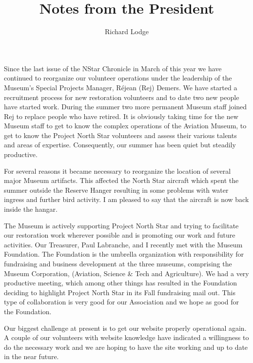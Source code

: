 
%


\title{Notes from the President}
\author{Richard Lodge}

\maketitle

Since the last issue of the NStar Chronicle in March of this year we
have continued to reorganize our volunteer operations under the
leadership of the Museum's Special Projects Manager, R\'{e}jean (Rej)
Demers. We have started a recruitment process for new restoration
volunteers and to date two new people have started work. During the
summer two more permanent Museum staff joined Rej to replace people who
have retired. It is obviously taking time for the new Museum staff to
get to know the complex operations of the Aviation Museum, to get to
know the Project North Star volunteers and assess their various talents
and areas of expertise. Consequently, our summer has been quiet but
steadily productive.

For several reasons it became necessary to reorganize the location of
several major Museum artifacts. This affected the North Star aircraft
which spent the summer outside the Reserve Hanger resulting in some
problems with water ingress and further bird activity. I am pleased to
say that the aircraft is now back inside the hangar.

The Museum is actively supporting Project North Star and trying to
facilitate our restoration work wherever possible and is promoting our
work and future activities. Our Treasurer, Paul Labranche, and I
recently met with the Museum Foundation. The Foundation is the umbrella
organization with responsibility for fundraising and business
development at the three museums, comprising the Museum Corporation,
(Aviation, Science \& Tech and Agriculture). We had a very productive
meeting, which among other things has resulted in the Foundation
deciding to highlight Project North Star in its Fall fundraising mail
out. This type of collaboration is very good for our Association and we
hope as good for the Foundation.

Our biggest challenge at present is to get our website properly
operational again. A couple of our volunteers with website knowledge
have indicated a willingness to do the necessary work and we are hoping
to have the site working and up to date in the near future.

